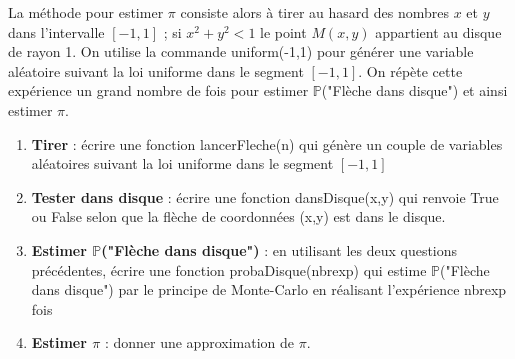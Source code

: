 \documentclass{article}
\theoremstyle{remark}
\begin{document}
La méthode pour estimer $\pi$ consiste alors à tirer au hasard des nombres $x$ et $y$ dans l'intervalle $[-1,1]$ ; 
si $x^2 + y^2 < 1$ le point $M(x,y)$ appartient au disque de rayon 1. On utilise la commande uniform(-1,1) pour générer une variable aléatoire suivant la loi uniforme dans le segment $[-1,1]$. On répète cette expérience un grand nombre de fois pour estimer $\mathbb{P}$("Flèche dans disque") et ainsi estimer $\pi$. 
\begin{enumerate}
\item \textbf{Tirer} : écrire une fonction lancerFleche(n) qui génère un couple de variables aléatoires suivant la loi uniforme dans le segment $[-1,1]$  
\item \textbf{Tester dans disque} : écrire une fonction dansDisque(x,y)
qui renvoie True ou False selon que la flèche de coordonnées (x,y) est dans le disque.
\item  \textbf{Estimer $\mathbb{P}$("Flèche dans disque")} : en utilisant les deux questions précédentes, écrire une fonction probaDisque(nbrexp)
qui estime $\mathbb{P}$("Flèche dans disque") par le principe de Monte-Carlo en réalisant l'expérience nbrexp fois
\item \textbf{Estimer $\pi$} : donner une approximation de $\pi$.
\end{enumerate}
\end{document}
